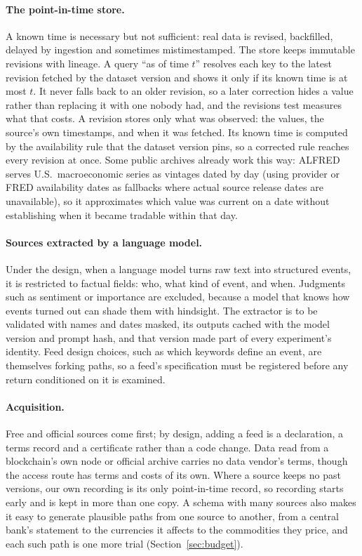 \documentclass[11pt]{article}
\begin{document}
\paragraph{The point-in-time store.} A known time is necessary but not sufficient: real data is revised, backfilled, delayed by ingestion and sometimes mistimestamped. The store keeps immutable revisions with lineage. A query ``as of time $t$'' resolves each key to the latest revision fetched by the dataset version and shows it only if its known time is at most $t$. It never falls back to an older revision, so a later correction hides a value rather than replacing it with one nobody had, and the revisions test measures what that costs. A revision stores only what was observed: the values, the source's own timestamps, and when it was fetched. Its known time is computed by the availability rule that the dataset version pins, so a corrected rule reaches every revision at once. Some public archives already work this way: ALFRED \cite{alfred} serves U.S.\ macroeconomic series as vintages dated by day (using provider or FRED availability dates as fallbacks where actual source release dates are unavailable), so it approximates which value was current on a date without establishing when it became tradable within that day.

\paragraph{Sources extracted by a language model.} Under the design, when a language model turns raw text into structured events, it is restricted to factual fields: who, what kind of event, and when. Judgments such as sentiment or importance are excluded, because a model that knows how events turned out can shade them with hindsight. The extractor is to be validated with names and dates masked, its outputs cached with the model version and prompt hash, and that version made part of every experiment's identity. Feed design choices, such as which keywords define an event, are themselves forking paths, so a feed's specification must be registered before any return conditioned on it is examined.

\paragraph{Acquisition.} Free and official sources come first; by design, adding a feed is a declaration, a terms record and a certificate rather than a code change. Data read from a blockchain's own node or official archive carries no data vendor's terms, though the access route has terms and costs of its own. Where a source keeps no past versions, our own recording is its only point-in-time record, so recording starts early and is kept in more than one copy. A schema with many sources also makes it easy to generate plausible paths from one source to another, from a central bank's statement to the currencies it affects to the commodities they price, and each such path is one more trial (Section~\ref{sec:budget}).
\end{document}
